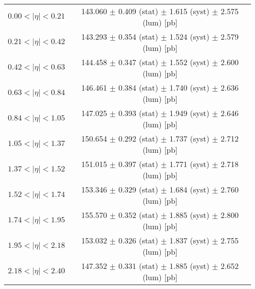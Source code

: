 \begin{tabular}{lc}
\hline
$0.00 < |\eta| <0.21$          & 143.060 $\pm$ 0.409 (stat) $\pm$ 1.615 (syst) $\pm$ 2.575 (lum) [pb]  \\
$0.21 < |\eta| <0.42$          & 143.293 $\pm$ 0.354 (stat) $\pm$ 1.524 (syst) $\pm$ 2.579 (lum) [pb]  \\
$0.42 < |\eta| <0.63$          & 144.458 $\pm$ 0.347 (stat) $\pm$ 1.552 (syst) $\pm$ 2.600 (lum) [pb]  \\
$0.63 < |\eta| <0.84$          & 146.461 $\pm$ 0.384 (stat) $\pm$ 1.740 (syst) $\pm$ 2.636 (lum) [pb]  \\
$0.84 < |\eta| <1.05$          & 147.025 $\pm$ 0.393 (stat) $\pm$ 1.949 (syst) $\pm$ 2.646 (lum) [pb]  \\
$1.05 < |\eta| <1.37$          & 150.654 $\pm$ 0.292 (stat) $\pm$ 1.737 (syst) $\pm$ 2.712 (lum) [pb]  \\
$1.37 < |\eta| <1.52$          & 151.015 $\pm$ 0.397 (stat) $\pm$ 1.771 (syst) $\pm$ 2.718 (lum) [pb]  \\
$1.52 < |\eta| <1.74$          & 153.346 $\pm$ 0.329 (stat) $\pm$ 1.684 (syst) $\pm$ 2.760 (lum) [pb]  \\
$1.74 < |\eta| <1.95$          & 155.570 $\pm$ 0.352 (stat) $\pm$ 1.885 (syst) $\pm$ 2.800 (lum) [pb]  \\
$1.95 < |\eta| <2.18$          & 153.032 $\pm$ 0.326 (stat) $\pm$ 1.837 (syst) $\pm$ 2.755 (lum) [pb]  \\
$2.18 < |\eta| <2.40$          & 147.352 $\pm$ 0.331 (stat) $\pm$ 1.885 (syst) $\pm$ 2.652 (lum) [pb]  \\
\hline
\end{tabular}
